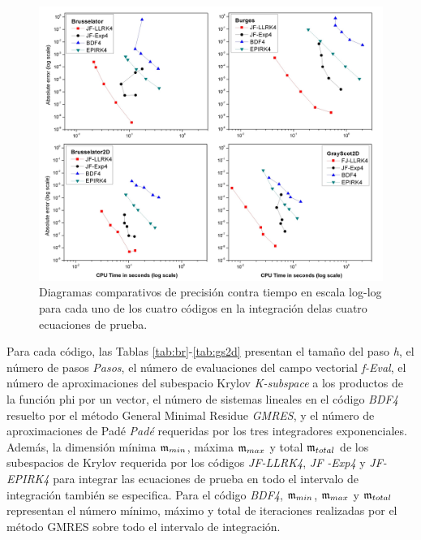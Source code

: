 \begin{figure}[htb]
	\centering
	\includegraphics[width=1\textwidth]{Graphics/lldp-fj/Diagram_new.jpg}
	\caption{Diagramas comparativos de precisión contra tiempo en escala log-log para cada uno de los cuatro códigos en la integración delas cuatro ecuaciones de prueba.} \label{work-precision diagram}
\end{figure}

Para cada código, las Tablas \ref{tab:br}-\ref{tab:gs2d} presentan el tamaño del paso \textit{h}, el número de pasos \textit{Pasos}, el número de evaluaciones del campo vectorial \textit{f-Eval}, el número de aproximaciones del subespacio Krylov \textit{K-subspace} a los productos de la función phi por un vector, el número de sistemas lineales en el código \textit{BDF4} resuelto por el método General Minimal Residue \textit {GMRES}, y el número de aproximaciones de Padé \textit{Padé} requeridas por los tres integradores exponenciales. Además, la dimensión mínima $\mathfrak{m}_{min}$, máxima $\mathfrak{m}_{max}$ y total $\mathfrak{m}_{total}$ de los subespacios de Krylov requerida por los códigos \textit{JF-LLRK4}, \textit{JF -Exp4} y \textit{JF-EPIRK4} para integrar las ecuaciones de prueba en todo el intervalo de integración también se especifica. Para el código \emph{BDF4}, $\mathfrak{m}_{min}$, $\mathfrak{m}_{max}$ y $\mathfrak{m}_{total}$ representan el número mínimo, máximo y total de iteraciones realizadas por el método GMRES sobre todo el intervalo de integración.


